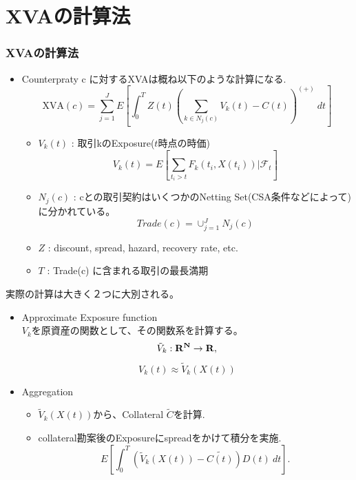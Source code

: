 \documentclass[driverfallback=dvipdfmx,cjk]{beamer}
\begin{document}
\section{XVAの計算法} 
\begin{frame}\frametitle{XVAの計算法}
    \begin{itemize}
        \item Counterpraty c に対するXVAは概ね以下のような計算になる.
            $$ \text{XVA}(c) = \sum_{j=1}^J E\left[\int_0^T Z(t)\left(\sum_{k \in N_j(c)}V_k(t)- C(t)\right)^{(+)} \ dt\right] $$
            \begin{itemize}
                \item $V_k(t)$ : 取引kのExposure($t$時点の時価)
                    $$ V_k(t) = E\left[ \sum_{t_i > t} F_k(t_i, X(t_i)) | \mathcal{F}_t\right]$$
                \item $N_j(c)$ : cとの取引契約はいくつかのNetting Set(CSA条件などによって)に分かれている。
                    $$Trade(c) = \cup_{j=1}^J N_j(c)$$ 
                \item $Z$ : discount, spread, hazard, recovery rate, etc.
                \item $T$ : Trade(c) に含まれる取引の最長満期
            \end{itemize}
    \end{itemize}
\end{frame} 

\begin{frame}
    実際の計算は大きく２つに大別される。
    \begin{itemize}
        \item Approximate Exposure function \\
            $V_k$を原資産の関数として、その関数系を計算する。
            $$ \tilde{V}_k: \bf{R}^N \rightarrow \bf{R},$$
            $$V_k(t) \approx \tilde{V}_k(X(t))$$

        \item Aggregation
            \begin{itemize}
                \item $\tilde{V}_k(X(t))$から、Collateral $\tilde{C}$を計算.
                \item collateral勘案後のExposureにspreadをかけて積分を実施.
                    $$ E\left[\int_0^T \left(\tilde{V}_k(X(t)) -\tilde{C(t)} \right) D(t)\ dt\right].$$
            \end{itemize}
    \end{itemize}
\end{frame}
\end{document}
